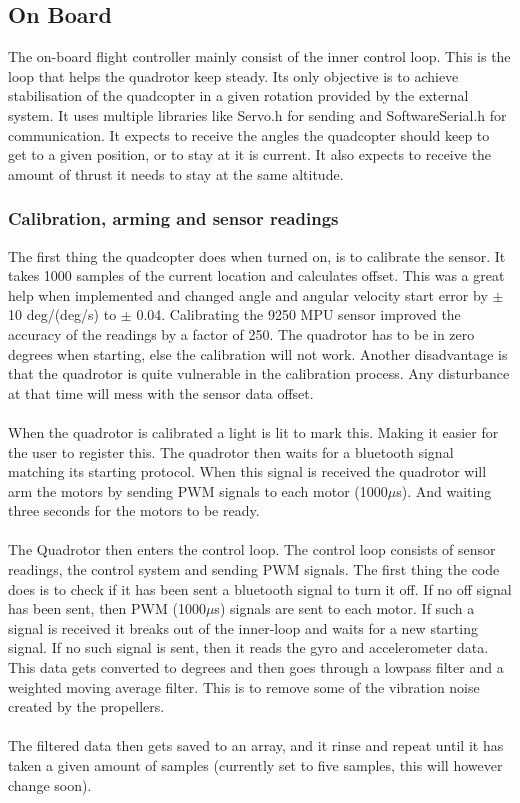 \subsection{On Board}
The on-board flight controller mainly consist of the inner control loop. This is the loop that helps the quadrotor keep steady. Its only objective is to achieve  stabilisation of the quadcopter in a given rotation provided by the external system. It uses multiple libraries like Servo.h for sending and SoftwareSerial.h for communication. It expects to receive the angles the quadcopter should keep to get to a given position, or to stay at it is current. It also expects to receive the amount of thrust it needs to stay at the same altitude. 

\subsubsection{Calibration, arming and sensor readings}
The first thing the quadcopter does when turned on, is to calibrate the sensor. It takes 1000 samples of the current location and calculates offset. This was a great help when implemented and changed angle and angular velocity start error by $\pm$ 10 deg/(deg/s) to $\pm$ 0.04. Calibrating the 9250 MPU sensor improved the accuracy of the readings by a factor of 250. The quadrotor has to be in zero degrees when starting, else the calibration will not work. Another disadvantage is that the quadrotor is quite vulnerable in the calibration process. Any disturbance at that time will mess with the sensor data offset.
\\\\
When the quadrotor is calibrated a light is lit to mark this. Making it easier for the user to register this. The quadrotor then waits for a bluetooth signal matching its starting protocol. When this signal is received the quadrotor will arm the motors by sending PWM signals to each motor (1000$\mu$s). And waiting three seconds for the motors to be ready. 
\\\\
The Quadrotor then enters the control loop. The control loop consists of sensor readings, the control system and sending PWM signals. The first thing the code does is to check if it has been sent a bluetooth signal to turn it off. If no off signal has been sent, then PWM (1000$\mu$s) signals are sent to each motor. If such a signal is received it breaks out of the inner-loop and waits for a new starting signal. If no such signal is sent, then it reads the gyro and accelerometer data. This data gets converted to degrees and then goes through a lowpass filter and a weighted moving average filter. This is to remove some of the vibration noise created by the propellers. 
\\\\
The filtered data then gets saved to an array, and it rinse and repeat until it has taken a given amount of samples (currently set to five samples, this will however change soon). \\
\newpage
